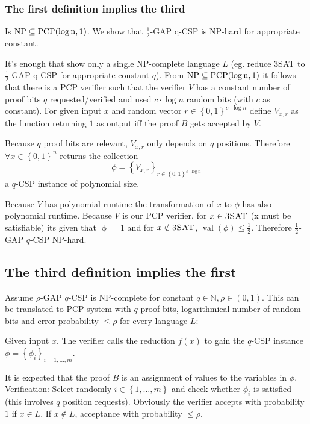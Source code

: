 \documentclass[a4paper]{article}
\newcommand{\cls}[1]{\rm{#1}}
\newcommand{\probl}[1]{\text{\textsc{#1}}}
\newcommand{\set}[1]{\left\{#1\right\}}
\begin{document}
\subsubsection{The first definition implies the third}
%
Is $\cls{NP} \subseteq \cls{PCP}(\log{n}, 1)$.
We show that $\frac12$-GAP q-CSP is \cls{NP}-hard for appropriate constant.

It's enough that show only a single \cls{NP}-complete language $L$
(eg. reduce 3SAT to $\frac12$-GAP q-CSP for appropriate constant
$q$). From $\cls{NP} \subseteq \cls{PCP}(\log{n}, 1)$ it follows that
there is a PCP verifier such that the verifier $V$ has a constant number
of proof bits $q$ requested/verified and used $c\cdot \log{n}$ random bits
(with $c$ as constant). For given input $x$ and random vector $r \in
\set{0,1}^{c\cdot\log{n}}$ define $V_{x,r}$ as the function returning
$1$ as output iff the proof $B$ gets accepted by $V$.

Because $q$ proof bits are relevant, $V_{x,r}$ only depends on $q$ positions.
Therefore $\forall x \in \set{0,1}^n$ returns the collection
\[
  \phi = \set{V_{x,r}}_{r \in \set{0,1}^{c\cdot\log{n}}}
\]
a $q$-CSP instance of polynomial size.

Because $V$ has polynomial runtime the transformation of $x$ to $\phi$ has
also polynomial runtime. Because $V$ is our PCP verifier, for $x \in \probl{3SAT}$
(x must be satisfiable) its given that $\operatorname{\phi} = 1$ and for
$x \notin \probl{3SAT}$, $\operatorname{val}(\phi) \leq \frac12$.
Therefore $\frac12$-GAP $q$-CSP \cls{NP}-hard.

\subsection{The third definition implies the first}
%
Assume $\rho$-GAP $q$-CSP is \cls{NP}-complete for constant $q \in \mathbb{N},
\rho \in (0,1)$. This can be translated to PCP-system with $q$ proof bits,
logarithmical number of random bits and error probability $\leq \rho$ for
every language $L$:

Given input $x$. The verifier calls the reduction $f(x)$ to gain the
$q$-CSP instance $\phi = \set{\phi_i}_{i=1,\ldots,m}$.

It is expected that the proof $B$ is an assignment of values to the
variables in $\phi$. Verification: Select randomly $i \in \set{1,\ldots,m}$
and check whether $\phi_i$ is satisfied (this involves $q$ position requests).
Obviously the verifier accepts with probability $1$ if $x \in L$.
If $x \notin L$, acceptance with probability $\leq \rho$.
\end{document}

